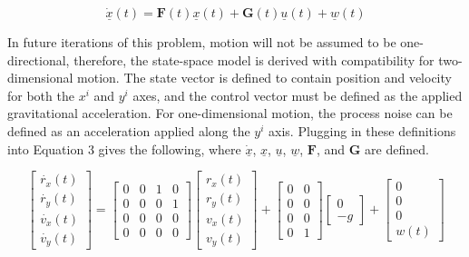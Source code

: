 \documentclass{article}
\begin{document}
\begin{equation}
    \underline{\dot{x}}(t) = \mathbf{F}(t)\underline{x}(t) + \mathbf{G}(t)\underline{u}(t) + \underline{w}(t)
\end{equation}

In future iterations of this problem, motion will not be assumed to be one-directional, therefore, the state-space model is derived with compatibility for two-dimensional motion. The state vector is defined to contain position and velocity for both the \textbf{$x^i$} and \textbf{$y^i$} axes, and the control vector must be defined as the applied gravitational acceleration. For one-dimensional motion, the process noise can be defined as an acceleration applied along the \textbf{$y^i$} axis. Plugging in these definitions into Equation 3 gives the following, where $\underline{\dot{x}}$, $\underline{x}$, $\underline{u}$, $\underline{w}$, $\mathbf{F}$, and $\mathbf{G}$ are defined.

\begin{equation*}
    \begin{bmatrix} \dot{r_x}(t) \\ \dot{r_y}(t) \\ \dot{v_x}(t) \\ \dot{v_y}(t) \end{bmatrix} = 
    \begin{bmatrix} 0 & 0 & 1 & 0 \\ 0 & 0 & 0 & 1 \\ 0 & 0 & 0 & 0 \\ 0 & 0 & 0 & 0 \end{bmatrix}
    \begin{bmatrix} r_x(t)\\r_y(t)\\v_x(t)\\v_y(t) \end{bmatrix} +
    \begin{bmatrix} 0 & 0 \\ 0 & 0 \\ 0 & 0 \\ 0 & 1 \end{bmatrix}
    \begin{bmatrix} 0\\-g \end{bmatrix} +
    \begin{bmatrix}
        0 \\ 0 \\ 0 \\ w(t)
    \end{bmatrix}
\end{equation*}
\end{document}
